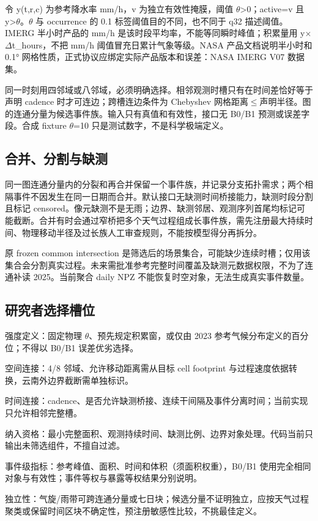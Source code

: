 \documentclass[UTF8,a4paper,10pt,fontset=fandol]{ctexart}
\begin{document}
令 y(t,r,c) 为参考降水率 mm/h，v 为独立有效性掩膜，阈值 \(\theta\)>0；active=v 且 y>\(\theta\)。\(\theta\) 与 occurrence 的 0.1 标签阈值目的不同，也不同于 q32 描述阈值。IMERG 半小时产品的 mm/h 是该时段平均率，不能等同瞬时峰值；积累量用 y×\(\Delta\)t\_\allowbreak{}hours，不把 mm/h 阈值冒充日累计气象等级。NASA 产品文档说明半小时和 0.1° 网格性质，正式协议应绑定实际产品版本和误差：NASA IMERG V07 数据集。\par

同一时刻用四邻域或八邻域，必须明确选择。相邻观测时槽只有在时间差恰好等于声明 cadence 时才可连边；跨槽连边条件为 Chebyshev 网格距离\(\le\)声明半径。图的连通分量为候选事件族。输入只有真值和有效性，接口无 B0/B1 预测或误差字段。合成 fixture \(\theta\)=10 只是测试数字，不是科学极端定义。\par

\subsection*{合并、分割与缺测}

同一图连通分量内的分裂和再合并保留一个事件族，并记录分支拓扑需求；两个相隔事件不因发生在同一日期而合并。默认接口无缺测时间桥接能力，缺测时段分割且标记 censored。像元缺测不是无雨；边界、缺测邻居、观测序列首尾均标记可能截断。合并有时会通过窄桥把多个天气过程组成长事件族，需先注册最大持续时间、物理移动半径及过长族人工审查规则，不能按模型得分再拆分。\par

原 frozen common intersection 是筛选后的场景集合，可能缺少连续时槽；仅用该集合会分割真实过程。未来需批准参考完整时间覆盖及缺测元数据权限，不为了连通补读 2025。当前聚合 daily NPZ 不能恢复时空对象，无法生成真实事件数量。\par

\subsection*{研究者选择槽位}

\noindent\textbullet\quad 强度定义：固定物理 \(\theta\)、预先规定积累窗，或仅由 2023 参考气候分布定义的百分位；不得以 B0/B1 误差优劣选择。\par
\noindent\textbullet\quad 空间连接：4/8 邻域、允许移动距离需从目标 cell footprint 与过程速度依据转换，云南外边界截断需单独标识。\par
\noindent\textbullet\quad 时间连接：cadence、是否允许缺测桥接、连续干间隔及事件分离时间；当前实现只允许相邻完整槽。\par
\noindent\textbullet\quad 纳入资格：最小完整面积、观测持续时间、缺测比例、边界对象处理。代码当前只输出未筛选组件，不擅自过滤。\par
\noindent\textbullet\quad 事件级指标：参考峰值、面积、时间和体积（须面积权重），B0/B1 使用完全相同对象与有效性；事件等权与暴露等权结果分别说明。\par
\noindent\textbullet\quad 独立性：气旋/雨带可跨连通分量或七日块；候选分量不证明独立，应按天气过程聚类或保留时间区块不确定性，预注册敏感性比较，不挑最佳定义。\par
\end{document}
